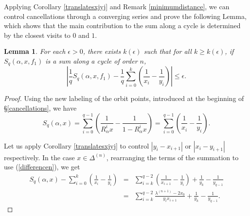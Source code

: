 \documentclass{conm-p-l}
\numberwithin{equation}{section}
\newtheorem{lemma}[theorem]{Lemma}
\begin{document}
Applying Corollary \ref{translatesxjyj} and Remark \ref{minimumdistance}, we can
control cancellations through a converging series and prove the following Lemma,
which shows that the main contribution to the sum along a cycle is determined by
the closest visits to $0$ and $1$.
\begin{lemma}\label{truncation}
For each $\epsilon>0$, there exists $k(\epsilon)$ such that for all $k\geq
k(\epsilon)$, if $ {S_{{q}}({\alpha}, {{x, f_1}})}$ is a sum along a
cycle of order $n$,
\begin{equation*}
\left| \frac{1}{q}  {S_{{q}}({\alpha}, {{x, f_1}})} -  \frac{1}{q}
\sum_{i=0}^{k}
 \left ( \frac{1}{x_i} - \frac{1}{y_i} \right) \right|  \leq
 \epsilon.
\end{equation*}
\end{lemma}
\begin{proof}
Using the new labeling of the orbit points, introduced at the beginning of
\S\ref{cancellations}, we have 
\begin{equation*} {S_{{q}}({\alpha}, {{x}})} = \sum_{i=0}^{q-1} \left(  \frac{1}{R_{\alpha}^i {x}} -
\frac{1}{1-R_{\alpha}^i {x}} \right) = \sum_{i=0}^{q-1} \left(  \frac{1}{x_i} -
\frac{1}{y_i}  
 \right).
\end{equation*}

Let us apply Corollary \ref{translatesxjyj} to control $\left|y_{i}- x_{i+1}
\right| $ or $\left| x_i -y_{i+1} \right| $ respectively.
 In the case ${x} \in \Delta^{(n)}$, rearranging the terms of the summation to use (\ref{differencen}), we get
\begin{eqnarray}
\label{cycleminusfirstpoints}
 {S_{{q}}({\alpha}, {{x}})} - \sum_{i=0}^k \left( \frac{1}{x_{i}}- \frac{1}{y_i} \right) 
 &=& \sum_{i=k}^{q-2} \left( \frac{1}{x_{i+1}} - \frac{1}{y_i} \right) + \frac{1}{y_k} - \frac{1}{y_{q-1}} \\ &=&\label{secondrearrang}
\sum_{i=k}^{q-2} \frac{{\lambda^{(n+1)}} -{2x_0}  }{y_i x_{i+1}} + \frac{1}{y_k} - \frac{1}{y_{q-1}} .
 \end{eqnarray}


\end{proof}
\end{document}
